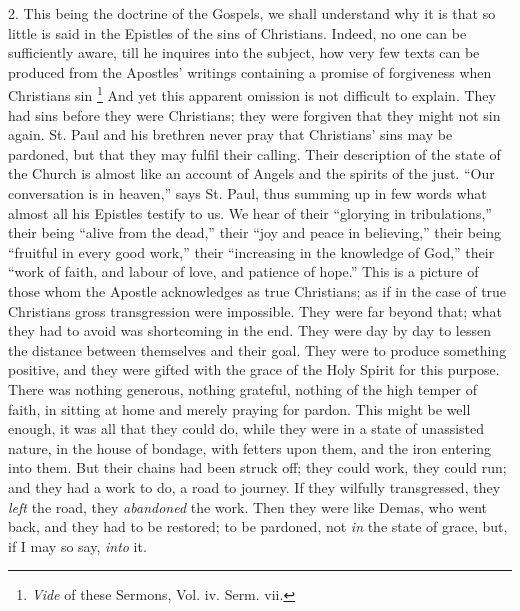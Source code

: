 2. This being the doctrine of the Gospels, we shall understand why
it is that so little is said in the Epistles of the sins of
Christians. Indeed, no one can be sufficiently aware, till he inquires
into the subject, how very few texts can be produced from the
Apostles' writings containing a promise of forgiveness when Christians
sin \footnote{\emph{Vide} of these Sermons, Vol. iv. Serm.
vii.} And yet this
apparent omission is not difficult to explain. They had sins before
they were Christians; they were forgiven that they might not sin
again. St. Paul and his brethren never pray that Christians' sins may
be pardoned, but that they may fulfil their calling. Their description
of the state of the Church is almost like an account of Angels and the
spirits of the just. ``Our conversation is in heaven,'' says
St. Paul, thus summing up in few words what almost all his Epistles
testify to us. We hear of their ``glorying in tribulations,''
their being ``alive from the dead,'' their ``joy and peace
in believing,'' their being ``fruitful in every good
work,'' their ``increasing in the knowledge of God,''
their ``work of faith, and labour of love, and patience of
hope.'' This is a picture of those whom the Apostle acknowledges
as true Christians; as if in the case of true Christians gross
transgression were impossible. They were far beyond that; what they
had to avoid was shortcoming in the end. They were day by day to
lessen the distance between themselves and their goal. They were to
produce something positive, and they were gifted with the grace of the
Holy Spirit for this purpose. There was nothing generous, nothing
grateful, nothing of the high temper of faith, in sitting at home and
merely praying for pardon. This might be well enough, it was all that
they could do, while they were in a state of unassisted nature, in the
house of bondage, with fetters upon them, and the iron entering into
them. But their chains had been struck off; they could work, they
could run; and they had a work to do, a road to journey. If they
wilfully transgressed, they \emph{left} the road, they \emph{abandoned}
the work. Then they were like Demas, who went back, and they had to be
restored; to be pardoned, not \emph{in} the state of grace, but, if I
may so say, \emph{into} it.

